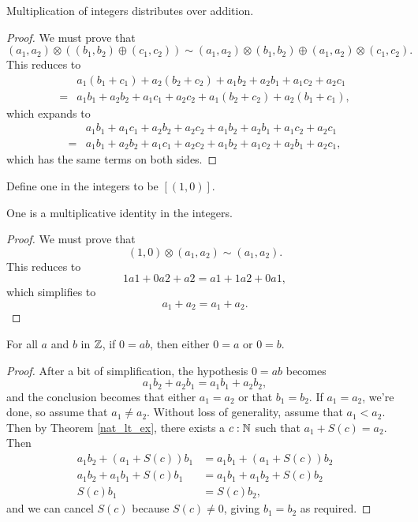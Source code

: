 \documentclass[../../math.tex]{subfiles}
\begin{document}
\begin{instance}
    Multiplication of integers distributes over addition.
\end{instance}
\begin{proof}
    We must prove that
    \[
        (a_1, a_2) \otimes ((b_1, b_2) \oplus (c_1, c_2)) \sim
        (a_1, a_2) \otimes (b_1, b_2) \oplus (a_1, a_2) \otimes (c_1, c_2).
    \]
    This reduces to
    \begin{align*}
        &{}a_1(b_1 + c_1) + a_2(b_2 + c_2) + a_1b_2 + a_2b_1 + a_1c_2 + a_2c_1\\
        {}={}&
        a_1b_1 + a_2b_2 + a_1c_1 + a_2c_2 + a_1(b_2 + c_2) + a_2(b_1 + c_1),
    \end{align*}
    which expands to
    \begin{align*}
        &{}a_1b_1 + a_1c_1 + a_2b_2 + a_2c_2 + a_1b_2 + a_2b_1 + a_1c_2 + a_2c_1
        \\ {}={}&
        a_1b_1 + a_2b_2 + a_1c_1 + a_2c_2 + a_1b_2 + a_1c_2 + a_2b_1 + a_2c_1,
    \end{align*}
    which has the same terms on both sides.
\end{proof}

\begin{instance}
    Define one in the integers to be $[(1, 0)]$.
\end{instance}

\begin{instance}
    One is a multiplicative identity in the integers.
\end{instance}
\begin{proof}
    We must prove that
    \[
        (1, 0) \otimes (a_1, a_2) \sim (a_1, a_2).
    \]
    This reduces to
    \[
        1a1 + 0a2 + a2 = a1 + 1a2 + 0a1,
    \]
    which simplifies to
    \[
        a_1 + a_2 = a_1 + a_2.
    \]
\end{proof}

\begin{lemma}
    For all $a$ and $b$ in $\mathbb{Z}$, if $0 = ab$, then either $0 = a$ or $0 = b$.
\end{lemma}
\begin{proof}
    After a bit of simplification, the hypothesis $0 = ab$ becomes
    \[
        a_1b_2 + a_2b_1 = a_1b_1 + a_2b_2,
    \]
    and the conclusion becomes that either $a_1 = a_2$ or that $b_1 = b_2$.  If
    $a_1 = a_2$, we're done, so assume that $a_1 \neq a_2$.  Without loss of
    generality, assume that $a_1 < a_2$.  Then by Theorem \ref{nat_lt_ex}, there
    exists a $c : \mathbb{N}$ such that $a_1 + S(c) = a_2$.  Then
    \begin{align*}
        a_1b_2 + (a_1 + S(c))b_1 &= a_1b_1 + (a_1 + S(c))b_2 \\
        a_1b_2 + a_1b_1 + S(c)b_1 &= a_1b_1 + a_1b_2 + S(c)b_2 \\
        S(c)b_1 &= S(c)b_2,
    \end{align*}
    and we can cancel $S(c)$ because $S(c) \neq 0$, giving $b_1 = b_2$ as
    required.
\end{proof}
\end{document}
